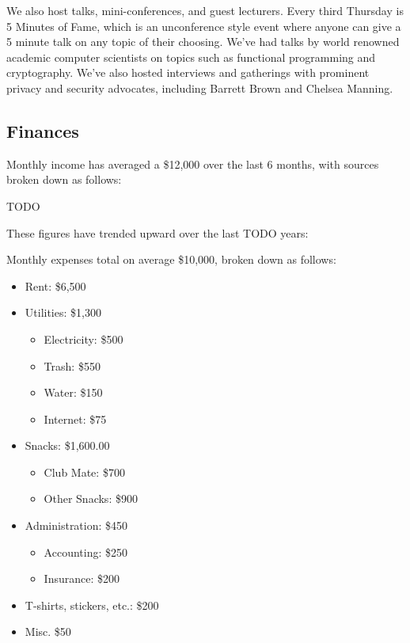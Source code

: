 \documentclass[12pt]{article}
\begin{document}
We also host talks, mini-conferences, and guest lecturers. Every third Thursday is 5 Minutes of Fame, which is an unconference style event where anyone can give a 5 minute talk on any topic of their choosing. We've had talks by world renowned academic computer scientists on topics such as functional programming and cryptography. We've also hosted interviews and gatherings with prominent privacy and security advocates, including Barrett Brown and Chelsea Manning.



\subsection{Finances}

Monthly income has averaged a \$12,000 over the last 6 months, with sources broken down as follows:

TODO

These figures have trended upward over the last TODO years:

Monthly expenses total on average \$10,000, broken down as follows:

\begin{itemize}
    \item Rent: \$6,500
    \item Utilities: \$1,300
        \begin{itemize}
            \item Electricity: \$500
            \item Trash: \$550
            \item Water: \$150
            \item Internet: \$75
        \end{itemize}
    \item Snacks: \$1,600.00
        \begin{itemize}
            \item Club Mate: \$700
            \item Other Snacks: \$900
        \end{itemize}
    \item Administration: \$450
        \begin{itemize}
            \item Accounting: \$250
            \item Insurance: \$200
        \end{itemize}
    \item T-shirts, stickers, etc.: \$200
    \item Misc. \$50
\end{itemize}
\end{document}
